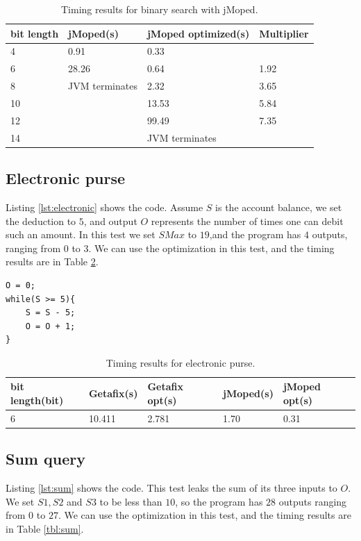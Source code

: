 \begin{table}[!h]
\begin{center}
\begin{tabular}{|l|l|l|l|}
\hline
bit length & jMoped(s) & jMoped optimized(s) & Multiplier \\ \hline
4 & 0.91 & 0.33 &  \\ \hline
6 & 28.26 & 0.64 & 1.92 \\ \hline
8 & JVM terminates & 2.32 & 3.65 \\ \hline
10 &  & 13.53 & 5.84 \\ \hline
12 &  & 99.49 & 7.35 \\ \hline
14 &  & JVM terminates &  \\ \hline
\end{tabular}
\end{center}
\caption{Timing results for binary search with jMoped.}
\label{tbl:binJ}
\end{table}

\subsection{Electronic purse}
Listing \ref{lst:electronic} shows the code. Assume $S$ is the account balance, we set the deduction to $5$, and output $O$ represents the number of times one can debit such an amount.  In this test we set $SMax$ to $19$,and the program has $4$ outputs, ranging from $0$ to $3$. We can use the optimization in this test, and the timing results are in Table \ref{tbl:electronic}.

\lstset{language=C}  
\begin{lstlisting}[float=!h, caption={Electronic purse test program.},label=lst:electronic]
O = 0;
while(S >= 5){
	S = S - 5;
	O = O + 1;
}
\end{lstlisting}

\begin{table}[!h]
\centering
\begin{tabular}{|l|l|l|l|l|}
\hline
{bit length(bit)} & Getafix(s) & {Getafix opt(s)} & jMoped(s) & {jMoped opt(s)} \\ \hline
{6} & {10.411} & {2.781} & {1.70} & {0.31} \\ \hline
\end{tabular}
\caption{Timing results for electronic purse.}
\label{tbl:electronic}
\end{table}

\subsection{Sum query}
Listing \ref{lst:sum} shows the code. This test leaks the sum of its three inputs to $O$. We set $S1, S2$ and $S3$ to be less than $10$, so the program has $28$ outputs ranging from $0$ to $27$. We can use the optimization in this test, and the timing results are in Table \ref{tbl:sum}.


